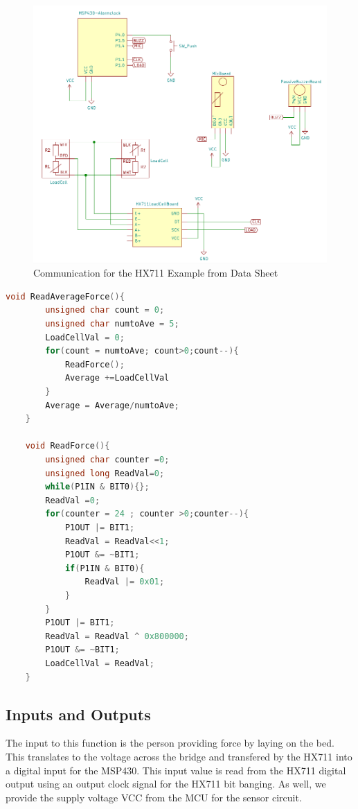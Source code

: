 \documentclass[11pt]{article}
\begin{document}
\begin{figure}[H]
	\centering
	\includegraphics[width = 0.8\linewidth]{fullscem}
	\caption{Communication for the HX711 Example from Data Sheet}
	\label{fig:fullCircuit}
\end{figure}
\begin{lstlisting}[label=ADCCode,caption=AX711 Reader Functions For Single ACD Value and Average, language = C,frame=single]
	void ReadAverageForce(){
		unsigned char count = 0;
		unsigned char numtoAve = 5;
		LoadCellVal = 0;
		for(count = numtoAve; count>0;count--){
			ReadForce();
			Average +=LoadCellVal
		}
		Average = Average/numtoAve;
	}
	
	void ReadForce(){
		unsigned char counter =0;
		unsigned long ReadVal=0;
		while(P1IN & BIT0){};
		ReadVal =0;
		for(counter = 24 ; counter >0;counter--){
			P1OUT |= BIT1;
			ReadVal = ReadVal<<1;
			P1OUT &= ~BIT1;
			if(P1IN & BIT0){
				ReadVal |= 0x01;
			}
		}
		P1OUT |= BIT1;
		ReadVal = ReadVal ^ 0x800000;
		P1OUT &= ~BIT1;
		LoadCellVal = ReadVal;
	}
\end{lstlisting}

\subsection*{Inputs and Outputs}
The input to this function is the person providing force by laying on the bed.
This translates to the voltage across the bridge and transfered by the HX711 into a digital input for the MSP430.
This input value is read from the HX711 digital output using an output clock signal for the HX711 bit banging. 
As well, we provide the supply voltage VCC from the MCU for the sensor circuit.
\end{document}
